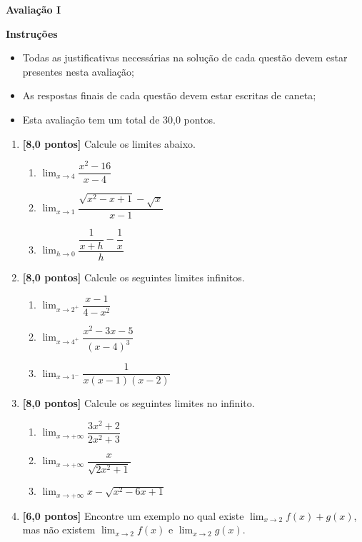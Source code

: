 \documentclass[12pt,a4paper]{article}
\begin{document}
\begin{center}
 \textbf{Avaliação I}
\end{center}

\textbf{Instruções}
\begin{itemize}
 \item Todas as justificativas necessárias na solução de cada questão devem estar presentes nesta avaliação;
 \item As respostas finais de cada questão devem estar escritas de caneta;
 \item Esta avaliação tem um total de 30,0 pontos.
\end{itemize}

\begin{enumerate}
  \item \textbf{[8,0 pontos]} Calcule os limites abaixo.
    \begin{enumerate}
     \item $\displaystyle \lim_{x\to 4} \dfrac{x^2 - 16}{x - 4}$
     \item $\displaystyle \lim_{x\to 1} \dfrac{\sqrt{x^2 - x + 1} - \sqrt{x}}{x - 1}$
     \item $\displaystyle \lim_{h\to 0} \dfrac{\dfrac{1}{x + h} - \dfrac{1}{x}}{h}$
    \end{enumerate}

  \item \textbf{[8,0 pontos]} Calcule os seguintes limites infinitos.
    \begin{enumerate}
     \item $\displaystyle \lim_{x\to 2^+} \dfrac{x - 1}{4 - x^2}$
     \item $\displaystyle \lim_{x\to 4^+} \dfrac{x^2 - 3x - 5}{(x - 4)^3}$
     \item $\displaystyle \lim_{x\to 1^-} \dfrac{1}{x(x - 1)(x - 2)}$
    \end{enumerate}

  \item \textbf{[8,0 pontos]} Calcule os seguintes limites no infinito.
    \begin{enumerate}
     \item $\displaystyle \lim_{x\to +\infty} \dfrac{3x^2 + 2}{2x^2 + 3}$
     \item $\displaystyle \lim_{x\to +\infty} \dfrac{x}{\sqrt{2x^2 + 1}}$
     \item $\displaystyle \lim_{x\to +\infty} x - \sqrt{x^2 -6x + 1}$
    \end{enumerate}
 
  \item \textbf{[6,0 pontos]} Encontre um exemplo no qual existe 
  $\displaystyle \lim_{x\to 2} f(x) + g(x)$, mas não existem 
  $\displaystyle \lim_{x\to 2} f(x)$ e 
  $\displaystyle \lim_{x\to 2} g(x)$.
    
  \end{enumerate}
\end{document}
